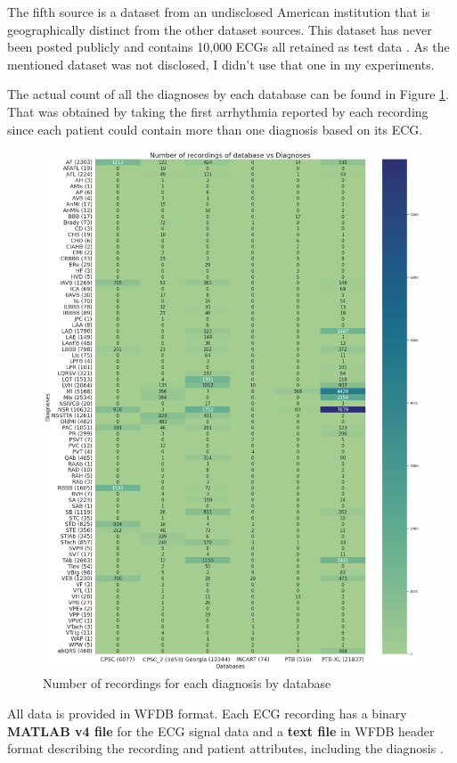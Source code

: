 The fifth source is a dataset from an undisclosed American institution that is geographically distinct from the other dataset sources. This dataset has never been posted publicly and contains 10,000 ECGs all retained as test data \cite{dataset2}. As the mentioned dataset was not disclosed, I didn't use that one in my experiments.

The actual count of all the diagnoses by each database can be found in Figure \ref{fig:diagnose_count_by_db}. That was obtained by taking the first arrhythmia reported by each recording since each patient could contain more than one diagnosis based on its ECG.

\begin{figure}[H]
\centering
\includegraphics[scale=0.3]{img/diagnose_count_by_db.png}
\caption{Number of recordings for each diagnosis by database}
\label{fig:diagnose_count_by_db}
\end{figure}

All data is provided in WFDB format. Each ECG recording has a binary \textbf{MATLAB v4 file} for the ECG signal data and a \textbf{text file} in WFDB header format describing the recording and patient attributes, including the diagnosis \cite{dataset3} \cite{dataset2} \cite{dataset4}.
